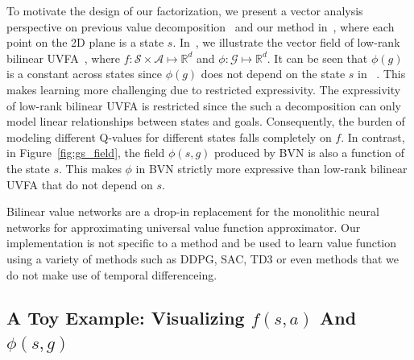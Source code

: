 \documentclass[dvipsnames]{article} %
\theoremstyle{definition}
\theoremstyle{remark}
\begin{document}
To motivate the design of our factorization, we present a vector analysis perspective on previous value decomposition~\cite{Schaul2015UVFA} and our method in~, where each point on the 2D plane is a state $s$. In~, we illustrate the vector field of low-rank bilinear UVFA~\citep{Schaul2015UVFA}, where $f: \mathcal{S}\times \mathcal{A} \mapsto \mathbb{R}^{d}$ and $\phi: \mathcal{G} \mapsto \mathbb{R}^{d}$. It can be seen that $\phi(g)$ is a constant across states since \(\phi(g)\) does not depend on the state \(s\) in ~. This makes learning more challenging due to restricted expressivity. The expressivity of low-rank bilinear UVFA is restricted since the such a decomposition can only model linear relationships between states and goals. Consequently, the burden of modeling different Q-values for different states falls completely on \(f\). In contrast, in Figure~\ref{fig:gs_field}, the field \(\phi(s, g)\) produced by BVN is also a function of the state \(s\). This makes \(\phi\) in BVN strictly more expressive than low-rank bilinear UVFA that do not depend on \(s\). 

Bilinear value networks are a drop-in replacement for the monolithic neural networks for approximating universal value function approximator. Our implementation is not specific to a method and be used to learn value function using a variety of methods such as DDPG, SAC, TD3 or even methods that we do not make use of temporal differenceing. 


\subsection{A Toy Example: Visualizing $f(s,a)$ And $\phi(s,g)$ }
\end{document}
